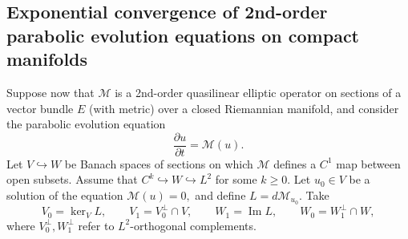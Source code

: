 \documentclass[12pt]{amsart}
\renewcommand{\Im}{\operatorname{Im}}
\newcommand{\calM}{\mathcal{M}}
\newcommand{\p}{{ \partial}}
\renewcommand{\1}{{\mathbf 1}}
\renewcommand{\p}{{\partial}}
\newcommand{\eps}{{\varepsilon}}
\theoremstyle{others}
\numberwithin{equation}{section}
\begin{document}

\vspace{10mm}




\subsection{Exponential convergence of 2nd-order parabolic evolution equations on compact manifolds}




Suppose now that %
$\calM$ is a 2nd-order quasilinear elliptic operator on sections of a vector bundle $E$ (with metric) over a closed Riemannian manifold, and consider the parabolic evolution equation
\begin{equation}\label{parabolicevolution}
\frac{ \p u}{\p t} = \mathcal{M}(u).
\end{equation}
Let $V \hookrightarrow W$ be Banach spaces of sections on which $\mathcal{M}$ defines a $C^1$ map between open subsets. Assume that $C^k \hookrightarrow W \hookrightarrow L^2$ for some $k \geq 0.$
Let $u_0 \in V$ be a solution of the equation $\calM(u) = 0,$ and define $L = d\mathcal{M}_{u_0}.$ Take
$$V_0 = \ker_V L, \qquad V_1 = V_0^\perp \cap V, \qquad W_1 = \Im L, \qquad W_0 = W_1^\perp \cap W,$$
where $V_0^\perp, W_1^\perp$ refer to $L^2$-orthogonal complements.
\end{document}

